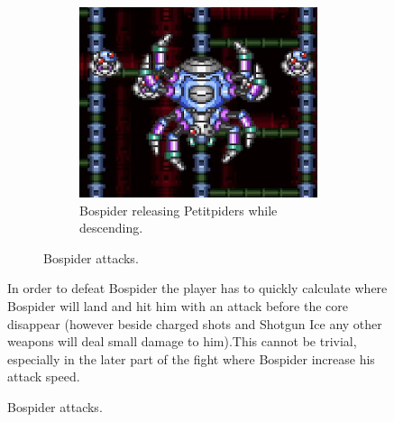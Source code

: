 \begin{figure}[htp]
\begin{figure}[htp]
\begin{subfigure}[t]{0.45\linewidth}
		\includegraphics[width=\linewidth]{figures/X1/Sigma_stages/Bospider_summon.jpg}
		\caption{Bospider releasing Petitpiders while descending.}
	\end{subfigure}
	\caption{Bospider attacks.}
\end{figure} 
In order to defeat Bospider the player has to quickly calculate where Bospider will land and hit him with an attack before the core disappear (however beside charged shots and Shotgun Ice any other weapons will deal small damage to him).This cannot be trivial, especially in the later part of the fight where Bospider increase his attack speed.




\end{figure}
